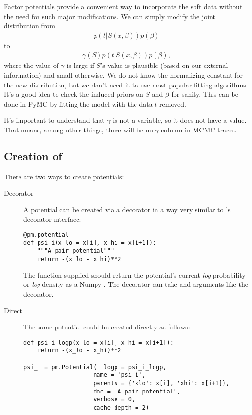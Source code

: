 Factor potentials provide a convenient way to incorporate the soft data without the need for such major modifications. We can simply modify the joint distribution from
\begin{eqnarray*}
    p(t|S(x,\beta)) p(\beta)
\end{eqnarray*}
to
\begin{eqnarray*}
    \gamma(S) p(t|S(x,\beta)) p(\beta),
\end{eqnarray*}
where the value of $\gamma$ is large if $S$'s value is plausible (based on our external information) and small otherwise. We do not know the normalizing constant for the new distribution, but we don't need it to use most popular fitting algorithms. It's a good idea to check the induced priors on $S$ and $\beta$ for sanity. This can be done in PyMC by fitting the model with the data $t$ removed.

It's important to understand that $\gamma$ is not a variable, so it does not have a value. That means, among other things, there will be no $\gamma$ column in MCMC traces.


\subsection[Creation of Potentials]{Creation of }
There are two ways to create potentials:
\begin{description}
    \item[Decorator] A potential can be created via a decorator in a way very similar to 's decorator interface:
\begin{verbatim}
@pm.potential
def psi_i(x_lo = x[i], x_hi = x[i+1]):
    """A pair potential"""
    return -(x_lo - x_hi)**2
\end{verbatim}
The function supplied should return the potential's current \emph{log}-probability or \emph{log}-density as a Numpy . The  decorator can take  and  arguments like the  decorator.
    \item[Direct] The same potential could be created directly as follows:
\begin{verbatim}
def psi_i_logp(x_lo = x[i], x_hi = x[i+1]):
    return -(x_lo - x_hi)**2

psi_i = pm.Potential(  logp = psi_i_logp,
                    name = 'psi_i',
                    parents = {'xlo': x[i], 'xhi': x[i+1]},
                    doc = 'A pair potential',
                    verbose = 0,
                    cache_depth = 2)
\end{verbatim}
\end{description}



